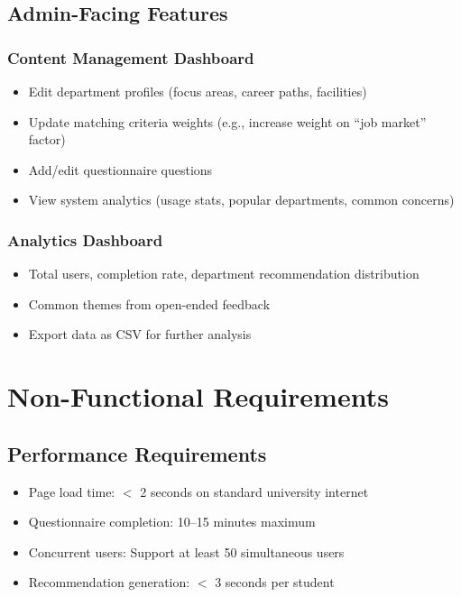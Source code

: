 \documentclass[12pt, a4paper]{article}
\begin{document}
\subsection{Admin-Facing Features}

\subsubsection*{Content Management Dashboard}
\begin{itemize}[leftmargin=1.5em, itemsep=2pt]
\item Edit department profiles (focus areas, career paths, facilities)
\item Update matching criteria weights (e.g., increase weight on ``job market'' factor)
\item Add/edit questionnaire questions
\item View system analytics (usage stats, popular departments, common concerns)
\end{itemize}

\subsubsection*{Analytics Dashboard}
\begin{itemize}[leftmargin=1.5em, itemsep=2pt]
\item Total users, completion rate, department recommendation distribution
\item Common themes from open-ended feedback
\item Export data as CSV for further analysis
\end{itemize}

\section{Non-Functional Requirements}

\subsection{Performance Requirements}
\begin{itemize}[leftmargin=1.5em, itemsep=3pt]
\item Page load time: $<$ 2 seconds on standard university internet
\item Questionnaire completion: 10–15 minutes maximum
\item Concurrent users: Support at least 50 simultaneous users
\item Recommendation generation: $<$ 3 seconds per student
\end{itemize}
\end{document}
